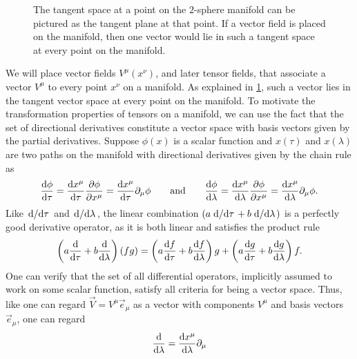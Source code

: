 \begin{figure}
\centering

\caption{\label{fig:tangent_space}%
	The tangent space at a point on the $2$-sphere manifold can be pictured as the tangent plane at that point.
	If a vector field is placed on the manifold, then one vector would lie in such a tangent space at every point on the manifold.
}
\end{figure}


\newcommand\lincombo[1]{\left( a \odv{#1}{\tau} + b \odv{#1}{\lambda} \right)}
\newcommand\lincomboslash[1]{\left( a \odv{#1}/{\tau} + b \odv{#1}/{\lambda} \right)}
We will place vector fields $V^\mu(x^\nu)$, and later tensor fields, that associate a vector $V^\mu$ to every point $x^\nu$ on a manifold.
As explained in \cref{fig:tangent_space}, such a vector lies in the tangent vector space at every point on the manifold.
To motivate the transformation properties of tensors on a manifold, we can use the fact that the set of directional derivatives constitute a vector space with basis vectors given by the partial derivatives. 
Suppose $\phi(x)$ is a scalar function and $x(\tau)$ and $x(\lambda)$ are two paths on the manifold with directional derivatives given by the chain rule as
\begin{equation}
	\odv{\phi}{\tau} = \odv{x^\mu}{\tau} \pdv{\phi}{x^\mu}
	                 = \odv{x^\mu}{\tau} \partial_\mu \phi
	\qquad \text{and} \qquad
	\odv{\phi}{\lambda} = \odv{x^\mu}{\lambda} \pdv{\phi}{x^\mu}
	                    = \odv{x^\mu}{\lambda} \partial_\mu \phi .
\end{equation}
Like $\odv{}/{\tau}$ and $\odv{}/{\lambda}$, the linear combination $\lincomboslash{}$ is a perfectly good derivative operator, as it is both linear and satisfies the product rule
\begin{equation}
	\lincombo{}(fg) = \lincombo{f} g + \lincombo{g} f .
\end{equation}
One can verify that the set of all differential operators, implicitly assumed to work on some scalar function, satisfy all criteria for being a vector space.
Thus, like one can regard $\vec{V} = V^\mu \vec{e}_\mu$ as a vector with components $V^\mu$ and basis vectors $\vec{e}_\mu$, one can regard
\begin{equation}
	\odv{}{\lambda} = \odv{x^{\mu}}{\lambda} \partial_{\mu} 
\end{equation}
